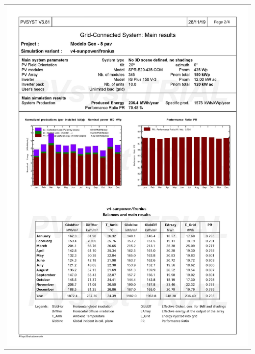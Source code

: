 \begin{table}[H]
    \centering
    \begin{tabular}{l}
        \includegraphics[width=\textwidth]{figures/attachments/resultpv22.jpg}
    \end{tabular}
\end{table}
\pagebreak
